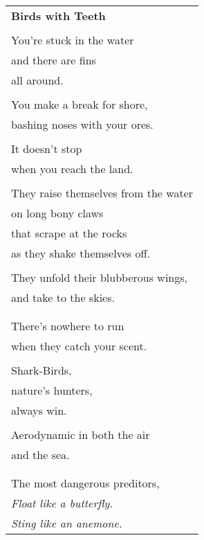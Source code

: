 \documentclass{article}
\begin{document}
\begin{center}
\begin{tabular}{l}
\textbf{Birds with Teeth} \\
\\
You're stuck in the water \\
and there are fins \\
all around. \\
\\
You make a break for shore, \\
bashing noses with your ores. \\
\\
It doesn't stop \\
when you reach the land. \\
\\
They raise themselves from the water \\
on long bony claws \\
that scrape at the rocks \\
as they shake themselves off. \\
\\
They unfold their blubberous wings, \\
and take to the skies. \\
\\
\\
There's nowhere to run \\
when they catch your scent. \\
\\
Shark-Birds, \\
nature's hunters, \\
always win. \\
\\
Aerodynamic in both the air \\
and the sea. \\
\\
\\
The most dangerous preditors, \\
\textit{Float like a butterfly.} \\
\textit{Sting like an anemone.} \\
\end{tabular}
\end{center}
\end{document}
